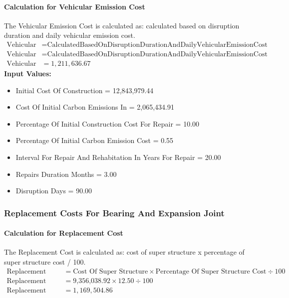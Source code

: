 \documentclass{article}
\begin{document}
 \paragraph{Calculation for Vehicular Emission Cost} 
The Vehicular Emission Cost is calculated as: calculated based on disruption duration and daily vehicular emission cost.
\begin{align*}
 \text{Vehicular Emission Cost} &= \text{Calculated} \text{Based} \text{On} \text{Disruption} \text{Duration} \text{And} \text{Daily} \text{Vehicular} \text{Emission} \text{Cost} \\
 \text{Vehicular Emission Cost} &= \text{Calculated} \text{Based} \text{On} \text{Disruption} \text{Duration} \text{And} \text{Daily} \text{Vehicular} \text{Emission} \text{Cost} \\
 \text{Vehicular Emission Cost} &= 1,211,636.67 
\end{align*}
\textbf{Input Values:}
\begin{itemize}
\item Initial Cost Of Construction = 12,843,979.44
\item Cost Of Initial Carbon Emissions In = 2,065,434.91
\item Percentage Of Initial Construction Cost For Repair = 10.00
\item Percentage Of Initial Carbon Emission Cost = 0.55
\item Interval For Repair And Rehabitation In Years For Repair = 20.00
\item Repairs Duration Months = 3.00
\item Disruption Days = 90.00
\end{itemize}
\subsubsection{Replacement Costs For Bearing And Expansion Joint}
 \paragraph{Calculation for Replacement Cost} 
The Replacement Cost is calculated as: cost of super structure x percentage of super structure cost / 100.
\begin{align*}
 \text{Replacement Cost} &= \text{Cost Of Super Structure} \times \text{Percentage Of Super Structure Cost} \div 100 \\
 \text{Replacement Cost} &= \text{9,356,038.92} \times 12.50 \div 100 \\
 \text{Replacement Cost} &= 1,169,504.86 
\end{align*}
\end{document}
